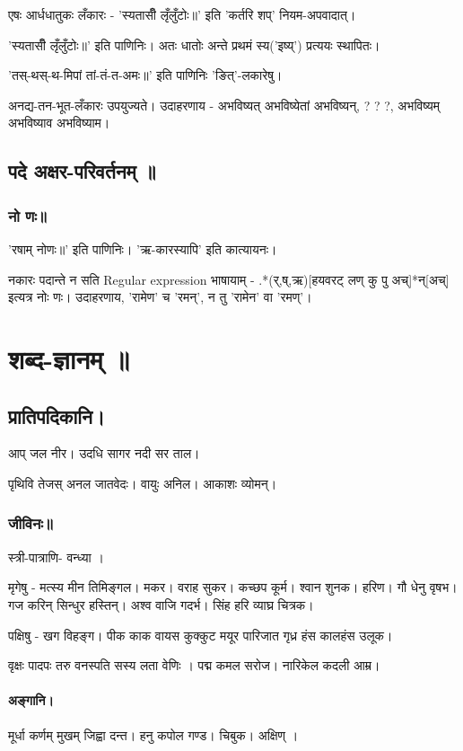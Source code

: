\documentclass[oneside, article]{memoir}
\begin{document}
एषः आर्धधातुकः लँकारः - 'स्यतासीँ लृँलुँटोः॥' इति 'कर्तरि शप्' नियम-अपवादात्।

'स्यतासीँ लृँलुँटोः॥' इति पाणिनिः। अतः धातोः अन्ते प्रथमं स्य('इष्य्') प्रत्ययः स्थापितः। 

'तस्-थस्-थ-मिपां तां-तं-त-अमः॥' इति पाणिनिः 'ङित्'-लकारेषु। 


अनद्य-तन-भूत-लँकारः उपयुज्यते। उदाहरणाय - अभविष्यत् अभविष्येतां अभविष्यन्, ? ? ?, अभविष्यम् अभविष्याव अभविष्याम।


\chapter{पदे अक्षर-परिवर्तनम् ॥}
\section{नो णः॥}
'रषाम् नोणः॥' इति पाणिनिः। 'ऋ-कारस्यापि' इति कात्यायनः।

नकारः पदान्ते न सति Regular expression भाषायाम् - .*(र्,ष्,ऋ)[हयवरट् लण् कु पु अच्]*न्[अच्] इत्यत्र नोः णः। उदाहरणाय, 'रामेण' च 'रमन्', न तु 'रामेन' वा 'रमण्'।

\part{शब्द-ज्ञानम् ॥}
\chapter{प्रातिपदिकानि।}
आप् जल नीर। उदधि सागर नदी सर ताल।

पृथिवि तेजस् अनल जातवेदः। वायुः अनिल। आकाशः व्योमन्।

\section{जीविनः॥}
स्त्री-पात्राणि- वन्ध्या ।

मृगेषु - मत्स्य मीन तिमिङ्गल। मकर। वराह सुकर। कच्छप कूर्म। श्वान शुनक। हरिण। गौ धेनु वृषभ। गज करिन् सिन्धुर हस्तिन्। अश्व वाजि गदर्भ। सिंह हरि व्याघ्र चित्रक।

पक्षिषु - खग विहङ्ग। पीक काक वायस कुक्कुट मयूर पारिजात गृध्र हंस कालहंस उलूक।

वृक्षः पादपः तरु वनस्पति सस्य लता वेणिः । पद्म कमल सरोज। नारिकेल कदली आम्र।


\subsection{अङ्गानि।}
मूर्धा कर्णम् मुखम् जिह्वा दन्त। हनु कपोल गण्ड। चिबुक। अक्षिण् ।
\end{document}
